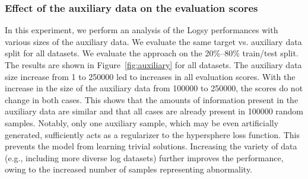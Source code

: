 \subsubsection{Effect of the auxiliary data on the evaluation scores}
In this experiment, we perform an analysis of the Logsy performances with various sizes of the auxiliary data. We evaluate the same target vs. auxiliary data split for all datasets. We evaluate the approach on the 20\%--80\% train/test split. The results are shown in Figure~\ref{fig:auxiliary} for all datasets. The auxiliary data size increase from 1 to 250000 led to increases in all evaluation scores. With the increase in the size of the auxiliary data from 100000 to 250000, the scores do not change in both cases. This shows that the amounts of information present in the auxiliary data are similar and that all cases are already present in 100000 random samples. Notably, only one auxiliary sample, which may be even artificially generated, sufficiently acts as a regularizer to the hypersphere loss function. This prevents the model from learning trivial solutions. Increasing the variety of data (e.g., including more diverse log datasets) further improves the performance, owing to the increased number of samples representing abnormality.








